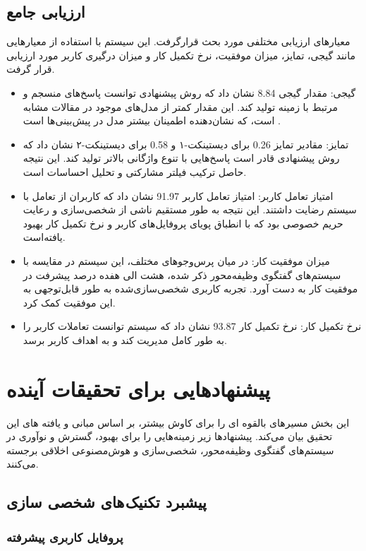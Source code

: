 \subsection{ارزیابی جامع}
 معیارهای ارزیابی مختلفی مورد بحث قرارگرفت. این سیستم با استفاده از معیارهایی مانند گیجی، تمایز، میزان موفقیت، نرخ تکمیل کار و میزان درگیری کاربر مورد ارزیابی قرار گرفت.
\begin{itemize}
\item
 گیجی: مقدار گیجی
\num{8.84}
 نشان داد که روش پیشنهادی توانست پاسخ‌های منسجم و مرتبط با زمینه تولید کند. این مقدار کمتر از مدل‌های موجود در مقالات مشابه است، که نشان‌دهنده اطمینان بیشتر مدل در پیش‌بینی‌ها است .
\item
 تمایز: مقادیر تمایز
\num{0.26}
برای دیستینکت-۱ و 
\num{0.58}
 برای دیستینکت-۲ نشان داد که روش پیشنهادی قادر است پاسخ‌هایی با تنوع واژگانی بالاتر تولید کند. این نتیجه حاصل ترکیب فیلتر مشارکتی و تحلیل احساسات است.
\item
 امتیاز تعامل کاربر: امتیاز تعامل کاربر 
\num{91.97}
 نشان داد که کاربران از تعامل با سیستم رضایت داشتند. این نتیجه به طور مستقیم ناشی از شخصی‌سازی و رعایت حریم خصوصی بود که با انطباق پویای پروفایل‌های کاربر و نرخ تکمیل کار بهبود یافته‌است.
\item
 میزان موفقیت کار: در میان پرس‌وجوهای مختلف، این سیستم در مقایسه با سیستم‌های گفتگوی وظیفه‌محور ذکر شده، هشت الی هفده درصد پیشرفت در موفقیت کار به دست آورد. تجربه کاربری شخصی‌سازی‌شده به طور قابل‌توجهی به این موفقیت کمک کرد. 
\item
نرخ تکمیل کار: نرخ تکمیل کار 
\num{93.87}
 نشان داد که سیستم توانست تعاملات کاربر را به طور کامل مدیریت کند و به اهداف کاربر برسد.
\end{itemize}


\section{پیشنهادهایی برای تحقیقات آینده}
این بخش مسیرهای بالقوه ای را برای کاوش بیشتر، بر اساس مبانی و یافته های این تحقیق بیان می‌کند. پیشنهادها زیر زمینه‌هایی را برای بهبود، گسترش و نوآوری در سیستم‌های گفتگوی وظیفه‌محور، شخصی‌سازی و هوش‌مصنوعی اخلاقی برجسته می‌کنند.

\subsection{پیشبرد تکنیک های شخصی سازی}

\subsubsection{پروفایل کاربری پیشرفته}

